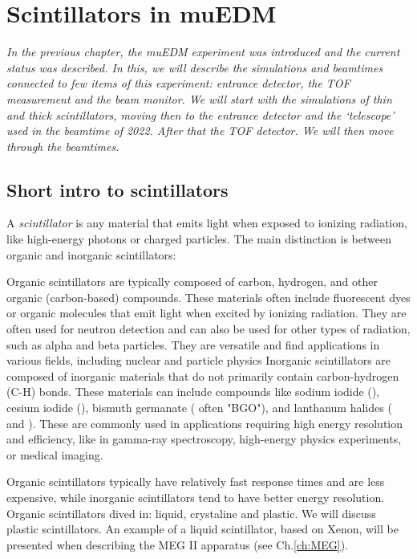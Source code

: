 \chapter{Scintillators in muEDM}
\label{ch:muEDM:entrance}
\begin{refsection}

{\itshape
In the previous chapter, the muEDM experiment was introduced and the current status was described.
In this, we will describe the simulations and beamtimes connected to few items of this experiment: entrance detector, the TOF measurement and the beam monitor. 
We will start with the \gf simulations of thin and thick scintillators, moving then to the entrance detector and the `telescope' used in the beamtime of 2022. 
After that the TOF detector.
We will then move through the beamtimes.
}

\section{Short intro to scintillators}
\label{sec:muEDM:scintillators}
    A \textit{scintillator} is any material that emits light when exposed to ionizing radiation, like high-energy photons or charged particles.
    The main distinction is between organic and inorganic scintillators:
    \begin{outline}
        \1 Organic scintillators are typically composed of carbon, hydrogen, and other organic (carbon-based) compounds. These materials often include fluorescent dyes or organic molecules that emit light when excited by ionizing radiation.
        They are often used for neutron detection and can also be used for other types of radiation, such as alpha and beta particles. They are versatile and find applications in various fields, including nuclear and particle physics
        \1 Inorganic scintillators are composed of inorganic materials that do not primarily contain carbon-hydrogen (C-H) bonds. These materials can include compounds like sodium iodide (), cesium iodide (), bismuth germanate ( often "BGO"), and lanthanum halides ( and ).
        These are commonly used in applications requiring high energy resolution and efficiency, like in gamma-ray spectroscopy, high-energy physics experiments, or medical imaging.
    \end{outline}
    Organic scintillators typically have relatively fast response times and are less expensive, while inorganic scintillators tend to have better energy resolution.
    Organic scintillators dived in: liquid, crystaline and plastic.
    We will discuss plastic scintillators. 
    An example of a liquid scintillator, based on Xenon, will be presented when describing the MEG II apparatus (see Ch.\ref{ch:MEG}).


\end{refsection}
